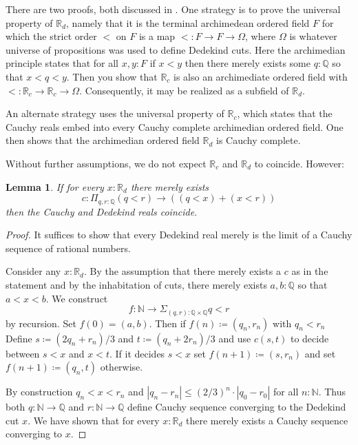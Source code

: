 \documentclass{amsart}
\theoremstyle{theorem}
\newtheorem*{lem}{Lemma}
\theoremstyle{definition}
\theoremstyle{remark}
\newcommand{\0}{\mathbbe{0}}
\newcommand{\1}{\mathbbe{1}}
\newcommand{\2}{\mathbbe{2}}
\newcommand{\3}{\mathbbe{3}}
\newcommand{\4}{\mathbbe{4}}
\newcommand{\NN}{\mathbb{N}}
\newcommand{\QQ}{\mathbb{Q}}
\newcommand{\RR}{\mathbb{R}}
\begin{document}
There are two proofs, both discussed in \cite{book-hott}. One strategy is to prove the universal property of $\RR_d$, namely that it is the terminal archimedean ordered field $F$ for which the strict order $<$ on $F$ is a map $< : F \to F \to \Omega$, where $\Omega$ is whatever universe of propositions was used to define Dedekind cuts. Here the archimedian principle states that for all $x,y : F$ if $x < y$ then there merely exists some $q: \QQ$ so that $x < q < y$. Then you show that $\RR_c$ is also an archimediate ordered field with $< \colon \RR_c \to \RR_c \to \Omega$. Consequently, it may be realized as a subfield of $\RR_d$.

An alternate strategy uses the universal property of $\RR_c$, which states that the Cauchy reals embed into every Cauchy complete archimedian ordered field. One then shows that the archimedian ordered field $\RR_d$ is Cauchy complete.

Without further assumptions, we do not expect $\RR_c$ and $\RR_d$ to coincide. However:

\begin{lem} If for every $x : \RR_d$ there merely exists
\[ c : \Pi_{q,r: \QQ} (q <r) \to ((q <x) + (x <r))\]
then the Cauchy and Dedekind reals coincide.
\end{lem}
\begin{proof}
It suffices to show that every Dedekind real merely is the limit of a Cauchy sequence of rational numbers. 

Consider any $x : \RR_d$. By the assumption that there merely exists a $c$ as in the statement and by the inhabitation of cuts, there merely exists $a, b : \QQ$ so that $a < x < b$. We construct 
\[f : \NN \to \Sigma_{(q,r): \QQ \times \QQ} q < r\]  by recursion. Set $f(0) = (a,b)$. Then if $f(n) \coloneq (q_n,r_n)$ with $q_n < r_n$ Define $s \coloneq (2q_n+r_n)/3$ and $t \coloneq (q_n+2r_n)/3$ and use $c(s,t)$ to decide between $s <x$ and $x < t$. If it decides $s < x$ set $f(n+1) \coloneq (s,r_n)$ and set $f(n+1) \coloneq (q_n,t)$ otherwise.

By construction $q_n < x < r_n$ and $|q_n-r_n| \leq (2/3)^n\cdot |q_0 - r_0|$ for all $n : \NN$. Thus both $q : \NN \to \QQ$ and $r \colon \NN \to \QQ$ define Cauchy sequence converging to the Dedekind cut $x$. We have shown that for every $x: \RR_d$ there merely exists a Cauchy sequence converging to $x$.
\end{proof}
\end{document}
